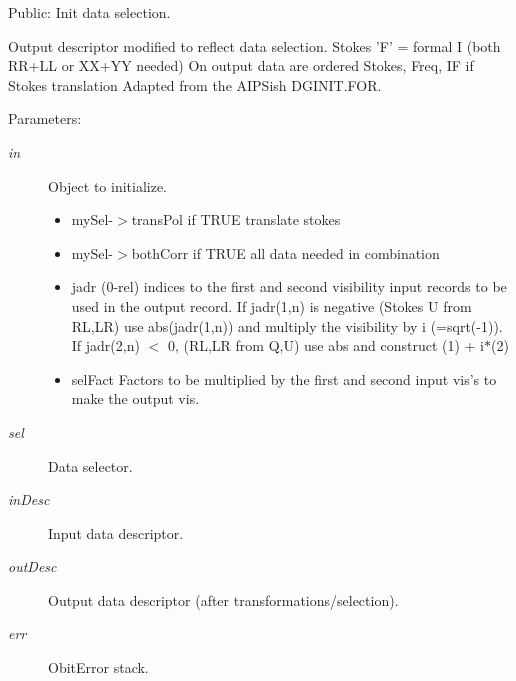 Public: Init data selection. 

Output descriptor modified to reflect data selection. Stokes 'F' = formal I (both RR+LL or XX+YY needed) On output data are ordered Stokes, Freq, IF if Stokes translation Adapted from the AIPSish DGINIT.FOR. \begin{Desc}
\item[Parameters:]
\begin{description}
\item[{\em in}]Object to initialize. \begin{itemize}
\item my\-Sel-$>$trans\-Pol if TRUE translate stokes \item my\-Sel-$>$both\-Corr if TRUE all data needed in combination \item jadr (0-rel) indices to the first and second visibility input records to be used in the output record. If jadr(1,n) is negative (Stokes U from RL,LR) use abs(jadr(1,n)) and multiply the visibility by i (=sqrt(-1)). If jadr(2,n) $<$ 0, (RL,LR from Q,U) use abs and construct (1) + i$\ast$(2) \item sel\-Fact Factors to be multiplied by the first and second input vis's to make the output vis. \end{itemize}
\item[{\em sel}]Data selector. \item[{\em in\-Desc}]Input data descriptor. \item[{\em out\-Desc}]Output data descriptor (after transformations/selection). \item[{\em err}]Obit\-Error stack. \end{description}
\end{Desc}
